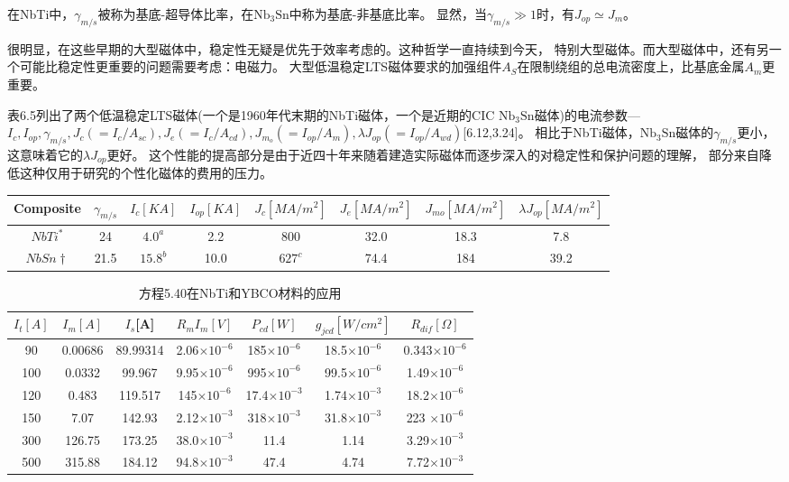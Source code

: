 在NbTi中，$\gamma_{m/s}$被称为基底-超导体比率，在$\mathrm{Nb_3Sn}$中称为基底-非基底比率。
显然，当$\gamma_{m/s}\gg 1$时，有$J_{op}\simeq J_m$。

很明显，在这些早期的大型磁体中，稳定性无疑是优先于效率考虑的。这种哲学一直持续到今天，
特别大型磁体。而大型磁体中，还有另一个可能比稳定性更重要的问题需要考虑：电磁力。
大型低温稳定LTS磁体要求的加强组件$A_S$在限制绕组的总电流密度上，比基底金属$A_m$更重要。

表6.5列出了两个低温稳定LTS磁体(一个是1960年代末期的NbTi磁体，一个是近期的CIC $\mathrm{Nb_3Sn}$磁体)的电流参数---$I_c,I_{op},\gamma_{m/s},J_c(=I_c/A_{sc}),J_e(=I_c/A_{cd}),
J_{m_o}(=I_{op}/A_m),\lambda J_{op}(=I_{op}/A_{wd})$[6.12,3.24]。
相比于NbTi磁体，$\mathrm{Nb_3Sn}$磁体的$\gamma_{m/s}$更小，这意味着它的$\lambda J_{op}$更好。
这个性能的提高部分是由于近四十年来随着建造实际磁体而逐步深入的对稳定性和保护问题的理解，
部分来自降低这种仅用于研究的个性化磁体的费用的压力。

\begin{table}[]
\begin{tabular}{|c|c|c|c|c|c|c|c|}
\hline
Composite & $\gamma_{m/s}$    & $I_c[KA]$    & $I_{op}[KA]$    &
$J_c[MA/m^2]$   & $J_e[MA/m^2]$    & $J_{mo}[MA/m^2]$   & $\lambda
J_{op}[MA/m^2]$    \\ \hline
$NbTi^*$      & 24   & $4.0^{a}$  & 2.2  & 800 & 32.0 & 18.3 & 7.8  \\
\hline
$NbSn\dag $     & 21.5 &$ 15.8^{b} $& 10.0 & $627^{c}$ & 74.4 & 184  &
39.2 \\ \hline
\end{tabular}
\end{table}


\begin{table}[htbp]\small
\centering
\caption{方程5.40在NbTi和YBCO材料的应用}  %
\begin{tabular}{|c|c|c|c|c|c|c|}
\hline
 $I_t[A]$   &$I_m[A]$         &$I_s$[A]          &$R_mI_m[V]$
 &$P_{cd}[W]$      &  $g_{jcd}[W/cm^2]$    & $R_{dif}[\Omega]$      \\
 \hline
90  & 0.00686 & 89.99314 & 2.06$\times10^{-6}$ & 185$\times10^{-6}$  & 18.5$\times10^{-6}$ & 0.343$\times10^{-6}$ \\ \hline
100 & 0.0332  & 99.967   & 9.95$\times10^{-6}$ & 995$\times10^{-6}$  & 99.5$\times10^{-6}$ & 1.49$\times10^{-6}$  \\ \hline
120 & 0.483   & 119.517  & 145$\times10^{-6}$  & 17.4$\times10^{-3}$ & 1.74$\times10^{-3}$ & 18.2$\times10^{-6}$  \\ \hline
150 & 7.07    & 142.93   & 2.12$\times10^{-3}$ & 318$\times10^{-3}$  & 31.8$\times10^{-3}$ & 223 $\times10^{-6}$  \\ \hline
300 & 126.75  & 173.25   & 38.0$\times10^{-3}$ & 11.4 & 1.14 & 3.29$\times10^{-3}$  \\ \hline
500 & 315.88  & 184.12   & 94.8$\times10^{-3}$ & 47.4 & 4.74 & 7.72$\times10^{-3}$  \\ \hline
\end{tabular}
\end{table}




